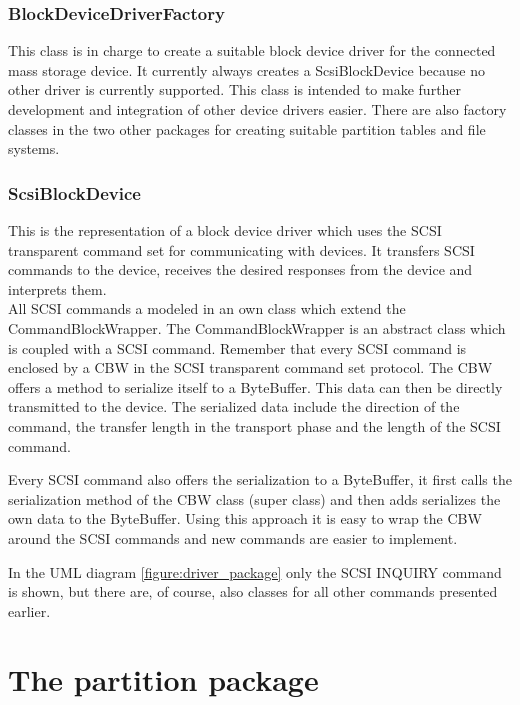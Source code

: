 \subsubsection{BlockDeviceDriverFactory}

This class is in charge to create a suitable block device driver for the connected mass storage device. It currently always creates a ScsiBlockDevice because no other driver is currently supported. This class is intended to make further development and integration of other device drivers easier. There are also factory classes in the two other packages for creating suitable partition tables and file systems.

\subsubsection{ScsiBlockDevice}

This is the representation of a block device driver which uses the SCSI transparent command set for communicating with devices. It transfers SCSI commands to the device, receives the desired responses from the device and interprets them.\\

All SCSI commands a modeled in an own class which extend the CommandBlockWrapper. The CommandBlockWrapper is an abstract class which is coupled with a SCSI command. Remember that every SCSI command is enclosed by a CBW in the SCSI transparent command set protocol. The CBW offers a method to serialize itself to a ByteBuffer. This data can then be directly transmitted to the device. The serialized data include the direction of the command, the transfer length in the transport phase and the length of the SCSI command.

Every SCSI command also offers the serialization to a ByteBuffer, it first calls the serialization method of the CBW class (super class) and then adds serializes the own data to the ByteBuffer. Using this approach it is easy to wrap the CBW around the SCSI commands and new commands are easier to implement. 

In the UML diagram \ref{figure:driver_package} only the SCSI INQUIRY command is shown, but there are, of course, also classes for all other commands presented earlier.

\section{The partition package}

